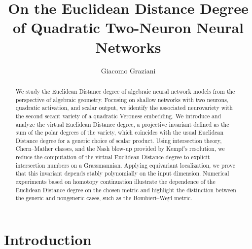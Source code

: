 \documentclass[11pt]{article}
\title{On the Euclidean Distance Degree of Quadratic Two-Neuron Neural Networks}
\author{Giacomo Graziani}
\date{}
\numberwithin{equation}{section}
\numberwithin{figure}{section}
\theoremstyle{plain}
\theoremstyle{definition}
\theoremstyle{remark}
\begin{document}
\maketitle
\begin{abstract}
We study the Euclidean Distance degree of algebraic neural network models from the perspective of algebraic geometry. Focusing on shallow networks with two neurons, quadratic activation, and scalar output, we identify the associated neurovariety with the second secant variety of a quadratic Veronese embedding. We introduce and analyze the virtual Euclidean Distance degree, a projective invariant defined as the sum of the polar degrees of the variety, which coincides with the usual Euclidean Distance degree for a generic choice of scalar product. Using intersection theory, Chern–Mather classes, and the Nash blow-up provided by Kempf’s resolution, we reduce the computation of the virtual Euclidean Distance degree to explicit intersection numbers on a Grassmannian. Applying equivariant localization, we prove that this invariant depends stably polynomially on the input dimension. Numerical experiments based on homotopy continuation illustrate the dependence of the Euclidean Distance degree on the chosen metric and highlight the distinction between the generic and nongeneric cases, such as the Bombieri–Weyl metric.
\end{abstract}

\tableofcontents

\section{Introduction}
\end{document}
